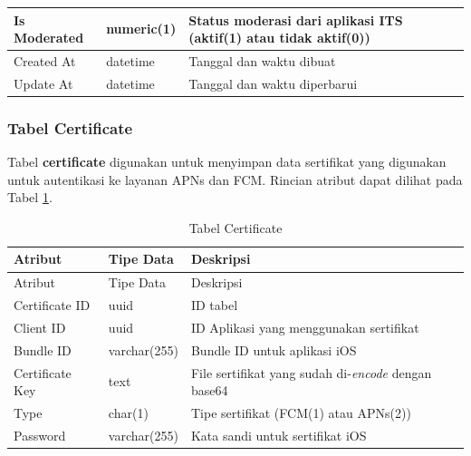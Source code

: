 \begin{longtable}{|p{2cm}|p{2.5cm}|p{4.5cm}|}
    Is Moderated & numeric(1) & Status moderasi dari aplikasi ITS (aktif(1) atau tidak aktif(0)) \\ \hline
    Created At & datetime & Tanggal dan waktu dibuat \\ \hline
    Update At & datetime & Tanggal dan waktu diperbarui \\ \hline
\end{longtable}

\subsubsection{Tabel Certificate}
\par Tabel \textbf{certificate} digunakan untuk menyimpan data sertifikat yang digunakan untuk autentikasi ke layanan APNs dan FCM. Rincian atribut dapat dilihat pada Tabel \ref{tabel_certificate}.
\begin{longtable}{|p{2cm}|p{2.5cm}|p{4.5cm}|}
	\caption{Tabel Certificate} \label{tabel_certificate} \\ \hline
    \rowcolor{lightgray} {Atribut} & {Tipe Data} & {Deskripsi} \\ \hline
    \endfirsthead
    \hline
    \rowcolor{lightgray} {Atribut} & {Tipe Data} & {Deskripsi} \\ \hline
    \endhead
    Certificate ID & uuid & ID tabel \\ \hline
    Client ID & uuid & ID Aplikasi yang menggunakan sertifikat \\ \hline
    Bundle ID & varchar(255) & Bundle ID untuk aplikasi iOS \\ \hline
    Certificate Key & text & File sertifikat yang sudah di-\textit{encode} dengan base64 \\ \hline
    Type & char(1) & Tipe sertifikat (FCM(1) atau APNs(2)) \\ \hline
    Password & varchar(255) & Kata sandi untuk sertifikat iOS \\ \hline
\end{longtable}

